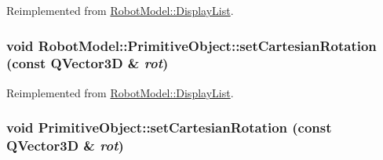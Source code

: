 Reimplemented from \hyperlink{class_robot_model_1_1_display_list_a56a652740c494995c0ff55d1a5fd896d}{RobotModel::DisplayList}.\hypertarget{class_robot_model_1_1_primitive_object_afa2afdbe412aadfe4d7bb951e4d7b8fa}{
\subsubsection[{setCartesianRotation}]{\setlength{\rightskip}{0pt plus 5cm}void RobotModel::PrimitiveObject::setCartesianRotation (const QVector3D \& {\em rot})}}
\label{class_robot_model_1_1_primitive_object_afa2afdbe412aadfe4d7bb951e4d7b8fa}


Reimplemented from \hyperlink{class_robot_model_1_1_display_list_a7d52ea010f54755bcb3bfae9e26dd0c2}{RobotModel::DisplayList}.\hypertarget{class_robot_model_1_1_primitive_object_a0a7cfefb126e4f37c208c516f8ffd9bb}{
\subsubsection[{setCartesianRotation}]{\setlength{\rightskip}{0pt plus 5cm}void PrimitiveObject::setCartesianRotation (const QVector3D \& {\em rot})}}
\label{class_robot_model_1_1_primitive_object_a0a7cfefb126e4f37c208c516f8ffd9bb}


